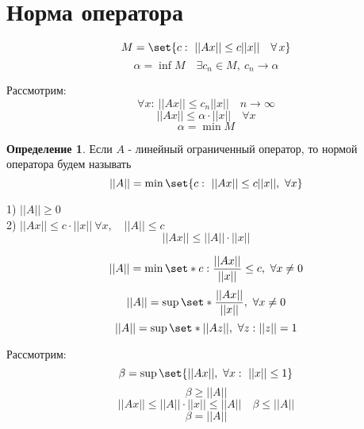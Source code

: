\documentclass[a4paper]{article}
\DeclarePairedDelimiter\set\{\}
\theoremstyle{definition}
\newtheorem*{definition}{Определение}
\theoremstyle{remark}
\begin{document}
\section*{\centering Норма оператора}

\[
    M = \set{c: \ ||Ax|| \leq c ||x|| \quad \forall \, x}
\]
\[
    \alpha = \inf M \quad \exists c_n \in M, \ c_n \to \alpha
\]

Рассмотрим:
\[
    \forall x : \ ||Ax|| \leq c_n ||x|| \quad n \to \infty
\]
\[
    ||Ax|| \leq \alpha \cdot ||x|| \quad \forall x
\]
\[
    \alpha = \min M
\]
\begin{tcolorbox}
\begin{definition}
    Если $ A $ - линейный ограниченный оператор, то нормой оператора будем называть
    \[
        ||A|| = \min \set{c: \ ||Ax|| \leq c ||x||, \ \forall x}
    \]
\end{definition}
\end{tcolorbox}

\begin{tcolorbox}
1) $ ||A|| \geq 0 $\\
2) $ ||Ax|| \leq c \cdot ||x|| \ \forall x, \quad ||A|| \leq c $\\
\begin{equation}
    ||Ax|| \leq ||A|| \cdot ||x||
\end{equation}
\end{tcolorbox}

\[
    ||A|| = \min \set*{c: \frac{||Ax||}{||x||} \leq c, \ \forall x \neq 0}
\]
\[
    ||A|| = \sup \set*{\frac{||Ax||}{||x||}, \ \forall x \neq 0}
\]
\[
    ||A|| = \sup \set*{||Az||, \ \forall z: ||z|| = 1}
\]

Рассмотрим:
\[
    \beta = \sup \set{||Ax||, \ \forall x: \ ||x|| \leq 1}
\]
\[
    \beta \geq ||A||
\]
\[
    ||Ax|| \leq ||A|| \cdot ||x|| \leq ||A|| \quad \beta \leq ||A||
\]
\[
    \beta = ||A||
\]
\end{document}
